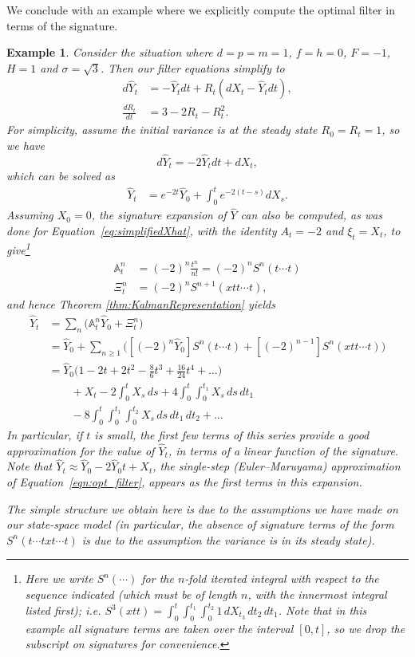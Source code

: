 \documentclass[a4paper, 12pt]{article}
\newtheorem{example}{Example}
\theoremstyle{remark}
\begin{document}
We conclude with an example where we explicitly compute the optimal filter in terms of the signature.

\begin{example}\label{ex:derive_coeffs_cts}
Consider the situation where $d=p=m=1$, $f=h=0$, $F=-1$, $H=1$ and $\sigma=\sqrt{3}$. Then our filter equations simplify to 
\begin{align*}
    d\hat Y_t &= -\hat Y_tdt + R_t(dX_t -\hat Y_tdt),\\
    \frac{dR_t}{dt} &= 3-2 R_t - R_t^2.
\end{align*}
For simplicity, assume the initial variance is at the steady state $R_0=R_t = 1$, so we have
\[d\hat Y_t = -2\hat Y_t dt + dX_t,\]
which can be solved as 
\begin{align*}
    \hat Y_t &= e^{-2t}\hat Y_0 + \int_{0}^t e^{-2(t-s)} dX_s.
\end{align*}
Assuming \(X_0=0\), the signature expansion of $\hat Y$ can also be computed, as was done for Equation~\eqref{eq:simplifiedXhat}, with the identity $A_t= -2$ and $\xi_t=X_t$, to give\footnote{Here we write $S^n(\cdots)$ for the $n$-fold iterated integral with respect to the sequence indicated (which must be of length $n$, with the innermost integral listed first); i.e. $S^3(xtt) = \int_0^t\int_0^{t_1}\int_0^{t_2} 1\,dX_{t_3}\, dt_2\, dt_1$. Note that in this example all signature terms are taken over the interval $[0,t]$, so we drop the subscript on signatures for convenience.}
\begin{align*}
    \mathbb{A}^n_t &= (-2)^n \frac{t^n}{n!} = (-2)^n S^n(t\cdots t)\\
    \Xi^n_t &= (-2)^n S^{n+1}(xtt\cdots t),
\end{align*}
and hence Theorem \ref{thm:KalmanRepresentation} yields
\begin{align*}
    \hat Y_t &= \sum_n \Big( \mathbb{A}^n_t \hat Y_0 + \Xi^n_t\Big)\\
    &= \hat Y_0+\sum_{n\ge 1} \Big([(-2)^n\hat Y_0] S^n(t\cdots t) + [(-2)^{n-1}] S^{n}(xtt\cdots t)\Big)\\
    &= \hat Y_0\Big(1 -2  t + 2 t^2 - \frac{8}{6}  t^3 + \frac{16}{24} t^4+\dots\Big)\\
    &\qquad + X_t - 2\int_0^t X_s \,ds + 4 \int_0^t\int_0^{t_1} X_s \,ds\, dt_1 \\
    &\qquad -8\int_0^t\int_0^{t_1}\int_0^{t_2} X_s\, ds\, dt_1\, dt_2+\dots
\end{align*}
In particular, if $t$ is small, the first few terms of this series provide a good approximation for the value of $\hat Y_t$, in terms of a linear function of the signature. Note that $\hat Y_t \approx \hat Y_0 -2\hat Y_0 t + X_t$, the single-step (Euler--Maruyama) approximation \citep{kloeden1992numerical} of Equation~\eqref{eqn:opt_filter}, appears as the first terms in this expansion.

The simple structure we obtain here is due to the assumptions we have made on our state-space model (in particular, the absence of signature terms of the form $S^n(t\cdots txt\cdots t)$ is due to the assumption the variance is in its steady state).
\end{example}
\end{document}

